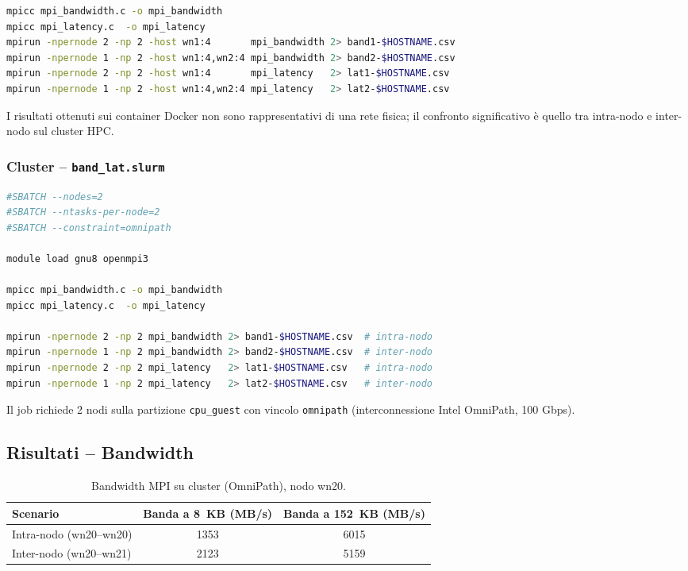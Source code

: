 \documentclass[a4paper,12pt]{article}
\begin{document}
\begin{lstlisting}[language=bash]
mpicc mpi_bandwidth.c -o mpi_bandwidth
mpicc mpi_latency.c  -o mpi_latency
mpirun -npernode 2 -np 2 -host wn1:4       mpi_bandwidth 2> band1-$HOSTNAME.csv
mpirun -npernode 1 -np 2 -host wn1:4,wn2:4 mpi_bandwidth 2> band2-$HOSTNAME.csv
mpirun -npernode 2 -np 2 -host wn1:4       mpi_latency   2> lat1-$HOSTNAME.csv
mpirun -npernode 1 -np 2 -host wn1:4,wn2:4 mpi_latency   2> lat2-$HOSTNAME.csv
\end{lstlisting}

I risultati ottenuti sui container Docker non sono rappresentativi di una rete fisica; il confronto significativo è quello tra intra-nodo e inter-nodo sul cluster HPC.

\subsubsection{Cluster -- \texttt{band\_lat.slurm}}

\begin{lstlisting}[language=bash]
#SBATCH --nodes=2
#SBATCH --ntasks-per-node=2
#SBATCH --constraint=omnipath

module load gnu8 openmpi3

mpicc mpi_bandwidth.c -o mpi_bandwidth
mpicc mpi_latency.c  -o mpi_latency

mpirun -npernode 2 -np 2 mpi_bandwidth 2> band1-$HOSTNAME.csv  # intra-nodo
mpirun -npernode 1 -np 2 mpi_bandwidth 2> band2-$HOSTNAME.csv  # inter-nodo
mpirun -npernode 2 -np 2 mpi_latency   2> lat1-$HOSTNAME.csv   # intra-nodo
mpirun -npernode 1 -np 2 mpi_latency   2> lat2-$HOSTNAME.csv   # inter-nodo
\end{lstlisting}

Il job richiede 2 nodi sulla partizione \texttt{cpu\_guest} con vincolo \texttt{omnipath} (interconnessione Intel OmniPath, 100 Gbps).

\subsection{Risultati -- Bandwidth}

\begin{table}[H]
\centering
\begin{tabular}{lcc}
\toprule
\textbf{Scenario} & \textbf{Banda a 8~KB (MB/s)} & \textbf{Banda a 152~KB (MB/s)} \\
\midrule
Intra-nodo (wn20--wn20) & 1353 & 6015 \\
Inter-nodo (wn20--wn21) & 2123 & 5159 \\
\bottomrule
\end{tabular}
\caption{Bandwidth MPI su cluster (OmniPath), nodo wn20.}
\end{table}
\end{document}
